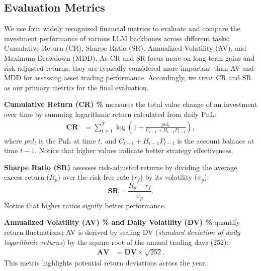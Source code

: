\subsection{Evaluation Metrics}
We use four widely recognized financial metrics \cite{hull2007risk} to evaluate and compare the investment performance of various LLM backbones across different tasks: Cumulative Return (CR), Sharpe Ratio (SR), Annualized Volatility (AV), and Maximum Drawdown (MDD). As CR and SR focus more on long-term gains and risk-adjusted returns, they are typically considered more important than AV and MDD for assessing asset trading performance. Accordingly, we treat CR and SR as our primary metrics for the final evaluation. 

\noindent\textbf{Cumulative Return (CR) \%} measures the total value change of an investment over time by summing logarithmic return calculated from daily PnL: 
\begin{align}
   \label{eq:cum_return}
   \textbf{CR} &= \sum_{t=1}^{T} \log{(1+\frac{pnl_t}{C_{t-1}+H_{t-1}P_{t-1}})},
\end{align}
where $pnl_t$ is the PnL at time $t$, and $C_{t-1}+H_{t-1}P_{t-1}$ is the account balance at time $t-1$. Notice that higher values indicate better strategy effectiveness.

\noindent\textbf{Sharpe Ratio (SR)} assesses risk-adjusted returns by dividing the average excess return ($R_p$) over the risk-free rate ($r_f$) by its volatility ($\sigma_p$):
\begin{equation}
    \textbf{SR} = \frac{R_p - r_f}{\sigma_p}.
\end{equation}  
Notice that higher ratios signify better performance.
  
\noindent\textbf{Annualized Volatility (AV) \% and Daily Volatility (DV) \%} quantify return fluctuations; AV is derived by scaling DV (\textit{standard deviation of daily logarithmic returns}) by the square root of the annual trading days (252): 
\begin{align}
   \label{eq:annuaVol}
    \textbf{AV} &= \textbf{DV} \times \sqrt{252}. 
\end{align} 
This metric highlights potential return deviations across the year.

